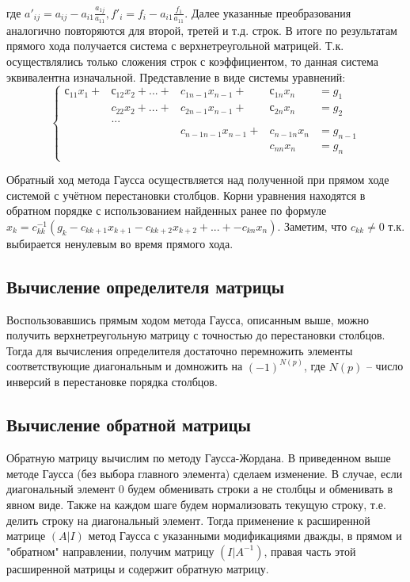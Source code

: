 \documentclass[a4paper,12pt,titlepage,finall]{article}
\begin{document}
\\
где $a'_{ij} = a_{ij} - a_{i1} \frac{a_{1j}}{a_{11}}, f'_i = f_i - a_{i1} \frac{f_1}{a_{11}}$. Далее указанные преобразования аналогично повторяются для второй, третей и т.д. строк. В итоге по результатам прямого хода получается система с верхнетреугольной матрицей. Т.к. осуществлялись только сложения строк с коэффициентом, то данная система эквивалентна изначальной. Представление в виде системы уравнений:
\begin{equation*}
\left\{
\begin{alignedat}{3}
с_{11} x_1 + & с_{12} x_2 + ... + & c_{1 n-1} x_{n-1} +     & с_{1n} x_n    & = g_1\\
             & c_{22} x_2 + ... + & c_{2 n-1} x_{n-1} +     & с_{2n} x_n    & = g_2\\
&...&&&\\
             &                    & c_{n - 1 n-1} x_{n-1} + & c_{n-1 n} x_n & = g_{n-1}\\
             &                    &                         & c_{nn} x_n    & = g_n\\
\end{alignedat}
\right.
\end{equation*}
\par
Обратный ход метода Гаусса осуществляется над полученной при прямом ходе системой с учётном перестановки столбцов. Корни уравнения находятся в обратном порядке с использованием найденных ранее по формуле $x_k = c^{-1}_{kk} (g_k - c_{k k+1}x_{k+1} - c_{k k+2}x_{k+2} + ... + - c_{k n}x_n)$. Заметим, что $c_{kk} \neq 0$ т.к. выбирается ненулевым во время прямого хода.

\subsection{Вычисление определителя матрицы}
Воспользовавшись прямым ходом метода Гаусса, описанным выше, можно получить верхнетреугольную матрицу с точностью до перестановки столбцов. Тогда для вычисления определителя достаточно перемножить элементы соответствующие диагональным и домножить на $(-1)^{N(p)}$, где $N(p)$ -- число инверсий в перестановке порядка столбцов.
\subsection{Вычисление обратной матрицы}
Обратную матрицу вычислим по методу Гаусса-Жордана. В приведенном выше методе Гаусса (без выбора главного элемента) сделаем изменение. В случае, если диагональный элемент 0 будем обменивать строки а не столбцы и обменивать в явном виде. Также на каждом шаге будем нормализовать текущую строку, т.е. делить строку на диагональный элемент. Тогда применение к расширенной матрице $(A|I)$ метод Гаусса с указанными модификациями дважды,  в прямом и "обратном" направлении, получим матрицу $(I|A^{-1})$, правая часть этой расширенной матрицы и содержит обратную матрицу.
\end{document}
